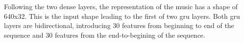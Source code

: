 
Following the two dense layers, the representation of the
music has a shape of 640x32. This is the input shape leading
to the first of two \gls{gru} layers. Both \gls{gru} layers
are bidirectional, introducing 30 features from beginning to
end of the sequence and 30 features from the end-to-begining
of the sequence.
